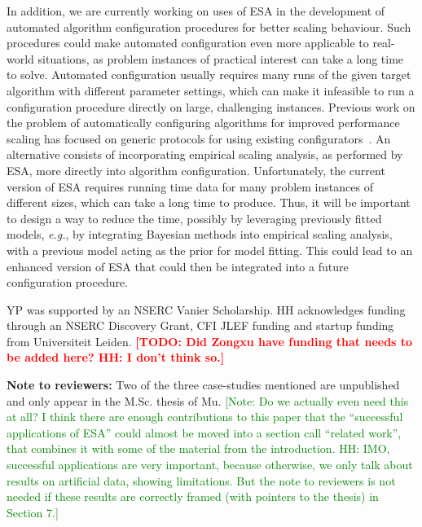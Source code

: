\documentclass[aic]{iosart2x}
\newcommand{\eg}{\emph{e.g.}}
\newcommand{\todo}[1]{\textcolor{red}{\bf [TODO: #1]}}
\newcommand{\note}[1]{\textcolor{green}{[Note: #1]}}
\begin{document}
In addition, we are currently working on uses of ESA in the development of automated algorithm configuration procedures for better scaling behaviour. Such procedures could make automated configuration even more applicable to real-world situations, as problem instances of practical interest can take a long time to solve. Automated configuration usually requires many runs of the given target algorithm with different parameter settings, which can make it infeasible to run a configuration procedure directly on large, challenging instances.
Previous work on the problem of automatically configuring algorithms for improved performance scaling has focused on generic protocols for using existing configurators~\cite{StyEtAl12,StyHoo13}. 
An alternative consists of incorporating empirical scaling analysis, as performed by ESA, more directly into algorithm configuration. Unfortunately, the current version of ESA requires running time data for many problem instances of different sizes,
which can take a long time to produce. Thus, it will be important to design a way to reduce the time, possibly by leveraging previously fitted models, \eg{}, by integrating Bayesian methods into empirical scaling analysis, with a previous model acting as the prior for model fitting. This could lead to an enhanced version of ESA that could then be integrated into a future configuration procedure.


\begin{acks}
YP was supported by an NSERC Vanier Scholarship. HH acknowledges funding through an NSERC Discovery Grant, CFI JLEF funding and startup funding from Universiteit Leiden. \todo{Did Zongxu have funding that needs to be added here? HH: I don't think so.}
\end{acks}

\bigskip


\noindent
\footnotesize
\textbf{Note to reviewers:} 
Two of the three case-studies mentioned
are unpublished and only appear in the M.Sc. thesis of Mu. \note{Do we actually even need this at all? I think there are enough contributions to this paper that the ``successful applications of ESA'' could almost be moved into a section call ``related work'', that combines it with some of the material from the introduction. HH: IMO, successful applications are very important, because otherwise, we only talk about results on artificial data, showing limitations. But the note to reviewers is not needed if these results are correctly framed (with pointers to the thesis) in Section 7.}
\end{document}
